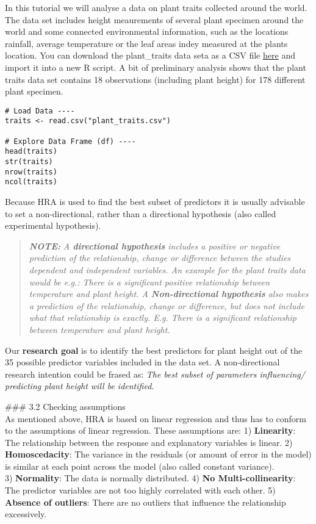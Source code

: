 \documentclass[
]{article}
\begin{document}
In this tutorial we will analyse a data on plant traits collected around
the world. The data set includes height meaurements of several plant
specimen around the world and some connected environmental information,
such as the locations rainfall, average temperature or the leaf areas
indey measured at the plants location. You can download the
plant\_traits data seta as a CSV file \href{}{here} and import it into a
new R script. A bit of preliminary analysis shows that the plant traits
data set contains 18 observations (including plant height) for 178
different plant specimen.

\begin{verbatim}
# Load Data ----
traits <- read.csv("plant_traits.csv")

# Explore Data Frame (df) ----
head(traits)
str(traits)
nrow(traits)
ncol(traits)
\end{verbatim}

Because HRA is used to find the best subset of predictors it is usually
advisable to set a non-directional, rather than a directional hypothesis
(also called experimental hypothesis).

\begin{quote}
\textbf{\emph{NOTE:}} \emph{A \textbf{directional hypothesis} includes a
positive or negative prediction of the relationship, change or
difference between the studies dependent and independent variables. An
example for the plant traits data would be e.g.: There is a significant
positive relationship between temperature and plant height. A
\textbf{Non-directional hypothesis} also makes a prediction of the
relationship, change or difference, but does not include what that
relationship is exactly. E.g. There is a significant relationship
between temperature and plant height.}
\end{quote}

Our \textbf{research goal} is to identify the best predictors for plant
height out of the 35 possible predictor variables included in the data
set. A non-directional research intention could be frased as: \emph{The
best subset of parameters influencing/ predicting plant height will be
identified.}

\#\#\# 3.2 Checking assumptions\\
As mentioned above, HRA is based on linear regression and thus has to
conform to the assumptions of linear regression. These assumptions are:
1) \textbf{Linearity}: The relationship between the response and
explanatory variables is linear. 2) \textbf{Homoscedacity}: The variance
in the residuals (or amount of error in the model) is similar at each
point across the model (also called constant variance).\\
3) \textbf{Normality}: The data is normally distributed. 4) \textbf{No
Multi-collinearity}: The predictor variables are not too highly
correlated with each other. 5) \textbf{Absence of outliers}: There are
no outliers that influence the relationship excessively.
\end{document}
